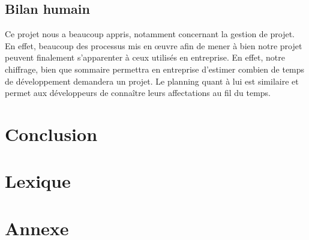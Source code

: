 \documentclass[a4paper,11pt]{article}
\begin{document}
\subsection{Bilan humain}
Ce projet nous a beaucoup appris, notamment concernant la gestion de projet. En effet, beaucoup des processus mis en œuvre afin de mener à bien notre projet peuvent finalement s'apparenter à ceux utilisés en entreprise. En effet, notre chiffrage, bien que sommaire permettra en entreprise d'estimer combien de temps de développement demandera un projet. Le planning quant à lui est similaire et permet aux développeurs de connaître leurs affectations au fil du temps.

\section*{Conclusion}

\section*{Lexique}

\section*{Annexe}
\end{document}
